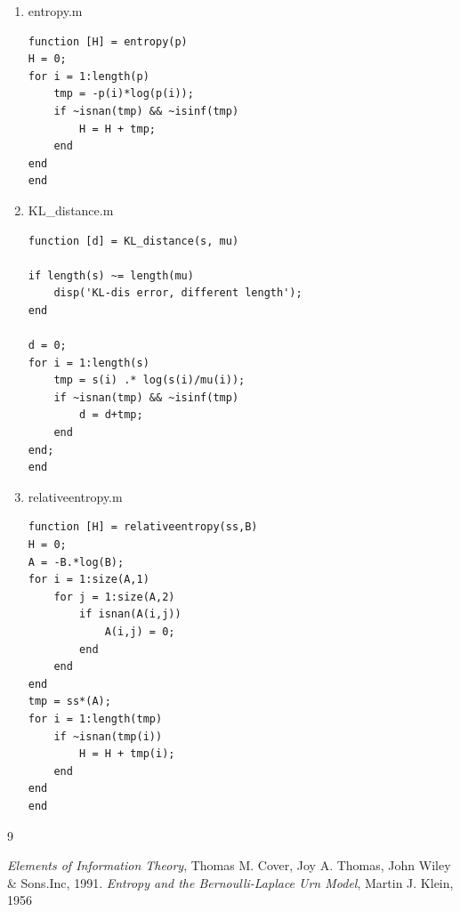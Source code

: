 \documentclass[a4paper, 11pt]{article} %
\begin{document}
\begin{enumerate}
\begin{lstlisting}[frame=single]
% Initial state
start_type = 1;
if start_type == 1 % random
    s = rand(1,n+1);
    s = s/sum(s);
elseif start_type == 2 % uniform
    s = ones(1,n+1);
    s = s/sum(s);
end
ss = s; % record initial state distribution

% Transition matrix from first state
B = A;
    
niter = n*2;
e = zeros(niter);
d = zeros(niter);
r = zeros(niter);

figure();
subplot(3,1,1);
stem(s); hold on;
legend('Distribution'); hold off;
axis([1,n+1,0,0.5]);
subplot(3,1,2);
plot(e); hold on;
legend('KL-distance'); hold off;
subplot(3,1,3);
plot(d); hold on;
legend('Conditioned Entropy','Shannon Entropy');
hold off;

for i = 1:niter
    s = s*A;
    d(i) = KL_distance(s',stationary);
    e(i) = entropy(s);
    % relative entropy
    r(i) = relativeentropy(ss,B);
    B = B*A;
    % plot
    subplot(3,1,1); stem(s);
    axis([1,n+1,0,0.5]);
    title(sprintf('Iteration: %d', i));
    legend('Distribution');
    subplot(3,1,2); plot(real(d(1:i))); 
    axis([0,niter,0,10]);
    title(sprintf('KL-distance: %f', d(i)));
    legend('KL-distance');
    subplot(3,1,3); plot(real(r(1:i))); hold on; 
    plot(e(1:i),'r-'); axis([0,niter,0,3]);
    title(sprintf('Conditioned Entropy: %f; ...
    Shannon Entropy: %f', r(i), e(i)));
    legend('Conditioned Entropy', 'Shannon Entropy');
    hold off;
    drawnow; pause(0.1);
end
\end{lstlisting}

\item entropy.m
\begin{lstlisting}[frame=single] 
function [H] = entropy(p)
H = 0;
for i = 1:length(p)
    tmp = -p(i)*log(p(i));
    if ~isnan(tmp) && ~isinf(tmp)
        H = H + tmp;
    end
end
end
\end{lstlisting}

\item KL\_distance.m
\begin{lstlisting}[frame=single] 
function [d] = KL_distance(s, mu)

if length(s) ~= length(mu)
    disp('KL-dis error, different length');
end

d = 0;
for i = 1:length(s)
    tmp = s(i) .* log(s(i)/mu(i));
    if ~isnan(tmp) && ~isinf(tmp)
        d = d+tmp;
    end
end;
end
\end{lstlisting}

\item relativeentropy.m
\begin{lstlisting}[frame=single] 
function [H] = relativeentropy(ss,B)
H = 0;
A = -B.*log(B);
for i = 1:size(A,1)
    for j = 1:size(A,2)
        if isnan(A(i,j))
            A(i,j) = 0;
        end
    end
end
tmp = ss*(A);
for i = 1:length(tmp)
    if ~isnan(tmp(i))
        H = H + tmp(i);
    end
end
end
\end{lstlisting}
\end{enumerate}

\newpage


\begin{thebibliography}{9}

\emph{Elements of Information Theory},
Thomas M. Cover, Joy A. Thomas,
John Wiley \& Sons.Inc,
1991.
\emph{Entropy and the Bernoulli-Laplace Urn Model},
Martin J. Klein,
1956
\end{thebibliography}
\end{document}
